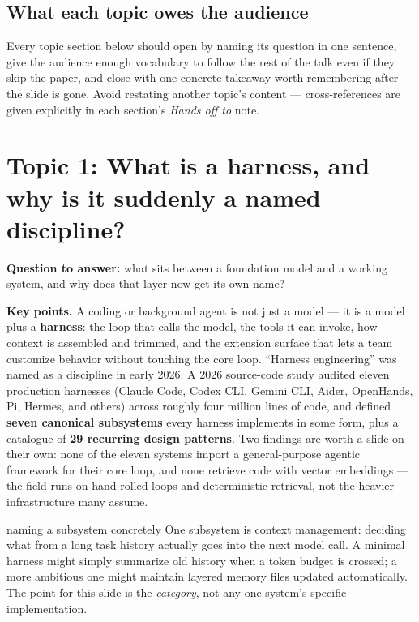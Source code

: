 \documentclass[12pt,a4paper]{article}
\begin{document}
\subsection{What each topic owes the audience}
Every topic section below should open by naming its question in one sentence, give the audience enough vocabulary to follow the rest of the talk even if they skip the paper, and close with one concrete takeaway worth remembering after the slide is gone. Avoid restating another topic's content --- cross-references are given explicitly in each section's \emph{Hands off to} note.

\section{Topic 1: What is a harness, and why is it suddenly a named discipline?}
\textbf{Question to answer:} what sits between a foundation model and a working system, and why does that layer now get its own name?

\textbf{Key points.} A coding or background agent is not just a model --- it is a model plus a \textbf{harness}: the loop that calls the model, the tools it can invoke, how context is assembled and trimmed, and the extension surface that lets a team customize behavior without touching the core loop. ``Harness engineering'' was named as a discipline in early 2026. A 2026 source-code study audited eleven production harnesses (Claude Code, Codex CLI, Gemini CLI, Aider, OpenHands, Pi, Hermes, and others) across roughly four million lines of code, and defined \textbf{seven canonical subsystems} every harness implements in some form, plus a catalogue of \textbf{29 recurring design patterns}. Two findings are worth a slide on their own: none of the eleven systems import a general-purpose agentic framework for their core loop, and none retrieve code with vector embeddings --- the field runs on hand-rolled loops and deterministic retrieval, not the heavier infrastructure many assume.

\begin{examplebox}{naming a subsystem concretely}
One subsystem is context management: deciding what from a long task history actually goes into the next model call. A minimal harness might simply summarize old history when a token budget is crossed; a more ambitious one might maintain layered memory files updated automatically. The point for this slide is the \emph{category}, not any one system's specific implementation.
\end{examplebox}
\end{document}
